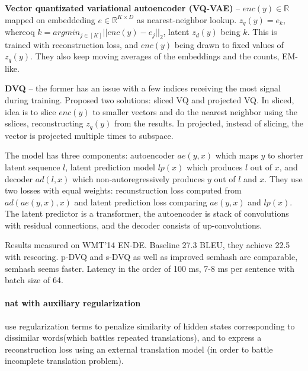\textbf{Vector quantizated variational autoencoder (VQ-VAE)} --
$enc(y)\in\mathbb{R}$ mapped on embeddeding $e\in\mathbb{R}^{K\times D}$ as
nearest-neighbor lookup. $z_q(y) = e_k$, whereoq
$k = argmin_{j\in[K]} || enc(y) - e_j ||_2$, latent $z_d(y)$ being $k$. This is
trained with reconstruction loss, and $enc(y)$ being drawn to fixed values of
$z_q(y)$. They also keep moving averages of the embeddings and the counts,
EM-like.

\textbf{DVQ} -- the former has an issue with a few indices receiving the most signal
during training. Proposed two solutions: sliced VQ and projected VQ. In sliced,
idea is to slice $enc(y)$ to smaller vectors and do the nearest neighbor using
the sslices, reconstructing $z_q(y)$ from the results. In projected, instead of
slicing, the vector is projected multiple times to subspace.

The model has three components: autoencoder $ae(y, x)$ which maps $y$ to shorter
latent sequence $l$, latent prediction model $lp(x)$ which produces $l$ out of
$x$, and decoder $ad(l, x)$ which non-autoregressively produces $y$ out of $l$
and $x$. They use two losses with equal weights: recunstruction loss computed
from $ad(ae(y,x),x)$ and latent prediction loss comparing $ae(y,x)$ and $lp(x)$.
The latent predictor is a transformer, the autoencoder is stack of convolutions
with residual connections, and the decoder consists of up-convolutions.

Results measured on WMT'14 EN-DE. Baseline 27.3 BLEU, they achieve 22.5 with
rescoring. p-DVQ and s-DVQ as well as improved semhash are comparable, semhash
seems faster. Latency in the order of 100 ms, 7-8 ms per sentence with batch
size of 64.



\paragraph{\Ac{nat} with auxiliary regularization}
\citet{wang2019nonautoregressive} use regularization terms to penalize
similarity of hidden states corresponding to dissimilar words(which battles
repeated translations), and to express a reconstruction loss using an external
translation model (in order to battle incomplete translation problem).

\paragraph{\citep{shao2020minimizing}}



